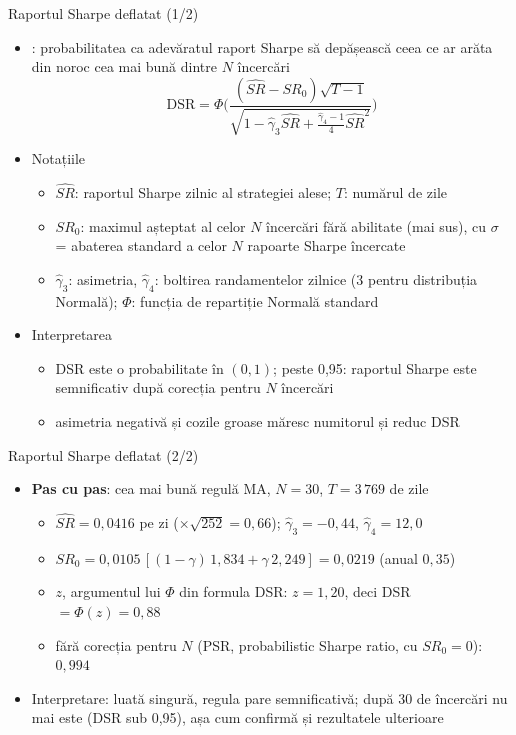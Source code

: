 \begin{frame}{Raportul Sharpe deflatat (1/2)}
\itemsize{\small}
\begin{itemize}
    \item {}: probabilitatea ca adevăratul raport Sharpe să depășească ceea ce ar arăta din noroc cea mai bună dintre $N$ încercări \[ \mathrm{DSR} = \Phi\Big(\dfrac{(\widehat{SR} - SR_0)\sqrt{T - 1}}{\sqrt{1 - \hat\gamma_3\widehat{SR} + \frac{\hat\gamma_4 - 1}{4}\widehat{SR}^2}}\Big) \]
    \item Notațiile
    \begin{itemize}
        \item $\widehat{SR}$: raportul Sharpe zilnic al strategiei alese; $T$: numărul de zile
        \item $SR_0$: maximul așteptat al celor $N$ încercări fără abilitate (mai sus), cu $\sigma$ = abaterea standard a celor $N$ rapoarte Sharpe încercate
        \item $\hat\gamma_3$: asimetria, $\hat\gamma_4$: boltirea randamentelor zilnice (3 pentru distribuția Normală); $\Phi$: funcția de repartiție Normală standard
    \end{itemize}
    \item Interpretarea
    \begin{itemize}
        \item DSR este o probabilitate în $(0, 1)$; peste 0,95: raportul Sharpe este semnificativ după corecția pentru $N$ încercări
        \item asimetria negativă și cozile groase măresc numitorul și reduc DSR
    \end{itemize}
\end{itemize}
\end{frame}

\begin{frame}{Raportul Sharpe deflatat (2/2)}
\itemsize{\small}
\begin{itemize}
    \item \textbf{Pas cu pas}: cea mai bună regulă MA, $N = 30$, $T = 3\,769$ de zile
    \begin{itemize}
        \item $\widehat{SR} = 0{,}0416$ pe zi ($\times\sqrt{252} = 0{,}66$); $\hat\gamma_3 = -0{,}44$, $\hat\gamma_4 = 12{,}0$
        \item $SR_0 = 0{,}0105\,[(1 - \gamma)\,1{,}834 + \gamma\,2{,}249] = 0{,}0219$ (anual $0{,}35$)
        \item $z$, argumentul lui $\Phi$ din formula DSR: $z = 1{,}20$, deci DSR $= \Phi(z) = 0{,}88$
        \item fără corecția pentru $N$ (PSR, probabilistic Sharpe ratio, cu $SR_0 = 0$): $0{,}994$
    \end{itemize}
    \item Interpretare: luată singură, regula pare semnificativă; după 30 de încercări nu mai este (DSR sub 0,95), așa cum confirmă și rezultatele ulterioare
\end{itemize}
\end{frame}


